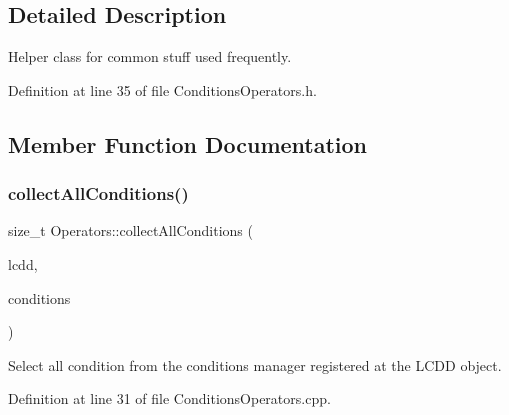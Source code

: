 \subsection{Detailed Description}
Helper class for common stuff used frequently. 

Definition at line 35 of file Conditions\+Operators.\+h.



\subsection{Member Function Documentation}
\hypertarget{class_d_d4hep_1_1_conditions_1_1_operators_a62f98243fbe0647f19444b0ad228dd12}{}\label{class_d_d4hep_1_1_conditions_1_1_operators_a62f98243fbe0647f19444b0ad228dd12} 
\subsubsection{\texorpdfstring{collect\+All\+Conditions()}{collectAllConditions()}\hspace{0.1cm}{\footnotesize\ttfamily [1/4]}}
{\footnotesize\ttfamily size\+\_\+t Operators\+::collect\+All\+Conditions (\begin{DoxyParamCaption}\item[{\hyperlink{class_d_d4hep_1_1_geometry_1_1_l_c_d_d}{Geometry\+::\+L\+C\+DD} \&}]{lcdd,  }\item[{\hyperlink{namespace_d_d4hep_1_1_conditions_ae765f0140a33973a430280f02b6062f4}{Range\+Conditions} \&}]{conditions }\end{DoxyParamCaption})\hspace{0.3cm}{\ttfamily [static]}}



Select all condition from the conditions manager registered at the L\+C\+DD object. 



Definition at line 31 of file Conditions\+Operators.\+cpp.

\hypertarget{class_d_d4hep_1_1_conditions_1_1_operators_a1561bd3845f72fcd583a7bfdc746649c}{}\label{class_d_d4hep_1_1_conditions_1_1_operators_a1561bd3845f72fcd583a7bfdc746649c} 
